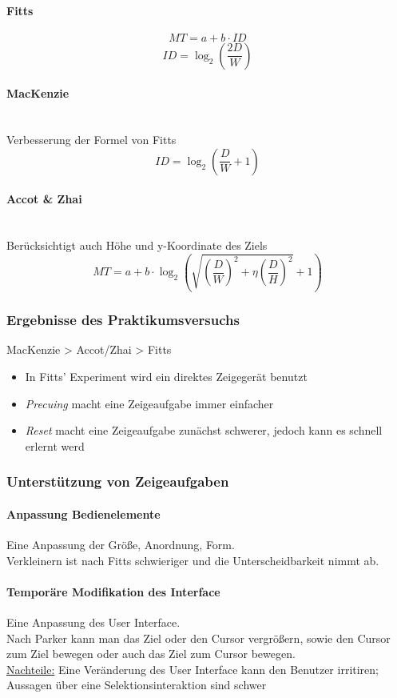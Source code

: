 \documentclass[8pt,a4paper,landscape]{extarticle}
\begin{document}
\begin{multicols*}{4}
	\paragraph{Fitts}
	\[MT = a + b \cdot ID\]
	\[ID = \log_{2}\left(\frac{2D}{W}\right)\]
	\paragraph{MacKenzie}\mbox{}\\
	Verbesserung der Formel von Fitts
	\[ID = \log_{2}\left(\frac{D}{W} + 1\right)\]
	\paragraph{Accot \& Zhai}\mbox{}\\
	Berücksichtigt auch Höhe und y-Koordinate des Ziels
	\[MT = a + b \cdot \log_{2}\left(\sqrt{\left(\frac{D}{W}\right)^{2}+\eta\left(\frac{D}{H}\right)^{2}} + 1\right)\]
	\subsubsection{Ergebnisse des Praktikumsversuchs}
	MacKenzie > Accot/Zhai > Fitts
	\begin{itemize}
		\item In Fitts' Experiment wird ein direktes Zeigegerät benutzt
		\item \emph{Precuing} macht eine Zeigeaufgabe immer einfacher
		\item \emph{Reset} macht eine Zeigeaufgabe zunächst schwerer, jedoch
		      kann es schnell erlernt werd
	\end{itemize}
	\subsubsection{Unterstützung von Zeigeaufgaben}
	\paragraph{Anpassung Bedienelemente} Eine Anpassung der Größe, Anordnung,
	Form. \\ Verkleinern ist nach Fitts schwieriger und die Unterscheidbarkeit
	nimmt ab.
	\paragraph{Temporäre Modifikation des Interface} Eine Anpassung des User
	Interface. \\ Nach Parker kann man das Ziel oder den Cursor vergrößern,
	sowie den Cursor zum Ziel bewegen oder auch das Ziel zum Cursor bewegen. \\
	\underline{Nachteile:} Eine Veränderung des User Interface kann den Benutzer
	irritiren; Aussagen über eine Selektionsinteraktion sind schwer

\end{multicols*}
\end{document}
